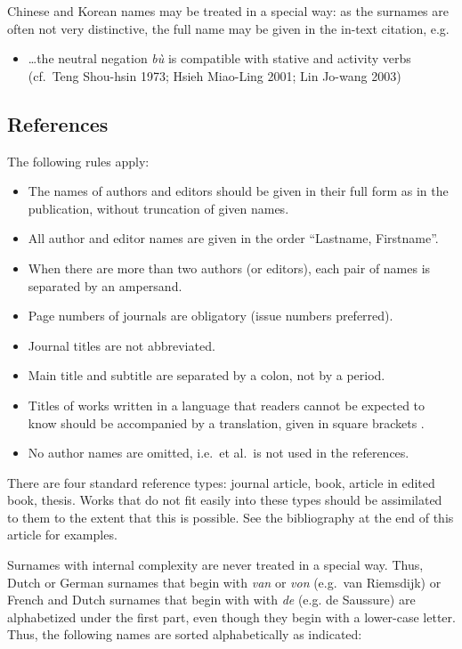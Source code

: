 \documentclass[cm,linguex]{glossa}
\providecommand{\tightlist}{%
  \setlength{\itemsep}{0pt}\setlength{\parskip}{0pt}}
\begin{document}
Chinese and Korean names may be treated in a special way: as the
surnames are often not very distinctive, the full name may be given in
the in-text citation, e.g.

\begin{itemize}
\tightlist
\item
  \ldots the neutral negation \emph{bù} is compatible with stative and
  activity verbs (cf.~Teng Shou-hsin 1973; Hsieh Miao-Ling 2001; Lin
  Jo-wang 2003)
\end{itemize}

\hypertarget{sec:refs}{%
\subsection{References}\label{sec:refs}}

The following rules apply:

\begin{itemize}
\item
  The names of authors and editors should be given in their full form as
  in the publication, without truncation of given names.
\item
  All author and editor names are given in the order ``Lastname,
  Firstname''.
\item
  When there are more than two authors (or editors), each pair of names
  is separated by an ampersand.
\item
  Page numbers of journals are obligatory (issue numbers preferred).
\item
  Journal titles are not abbreviated.
\item
  Main title and subtitle are separated by a colon, not by a period.
\item
  Titles of works written in a language that readers cannot be expected
  to know should be accompanied by a translation, given in square
  brackets \citep{Li1999}.
\item
  No author names are omitted, i.e.~et al.~is not used in the
  references.
\end{itemize}

There are four standard reference types: journal article, book, article
in edited book, thesis. Works that do not fit easily into these types
should be assimilated to them to the extent that this is possible. See
the bibliography at the end of this article for examples.

Surnames with internal complexity are never treated in a special way.
Thus, Dutch or German surnames that begin with \emph{van} or \emph{von}
(e.g.~van Riemsdijk) or French and Dutch surnames that begin with with
\emph{de} (e.g. de Saussure) are alphabetized under the first part, even
though they begin with a lower-case letter. Thus, the following names
are sorted alphabetically as indicated:
\end{document}
